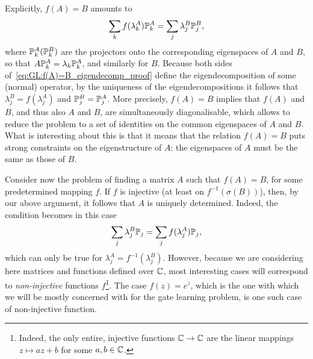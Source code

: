 Explicitly, $f(A)=B$ amounts to
\begin{equation}
    \sum_k f(\lambda_k^A) {\mathbb{P}}_k^A = \sum_j \lambda_j^B {\mathbb{P}}_j^B,
    \label{eq:GL:f(A)=B_eigendecomp_proof}
\end{equation}
where ${\mathbb{P}}_k^{A} ({\mathbb{P}}_k^{B})$ are the projectors onto the corresponding eigenspaces of $A$ and $B$, so that
$A{\mathbb{P}}_k^A=\lambda_k {\mathbb{P}}_k^A$, and similarly for $B$.
Because both sides of~\cref{eq:GL:f(A)=B_eigendecomp_proof} define the eigendecomposition of some (normal) operator, by the uniqueness of the eigendecompositions it follows that $\lambda_j^B=f(\lambda_j^A)$ and ${\mathbb{P}}_j^B={\mathbb{P}}_j^A$.
More precisely, $f(A)=B$ implies that $f(A)$ and $B$, and thus also $A$ and $B$, are simultaneously diagonalisable, which allows to reduce the problem to a set of identities on the common eigenspaces of $A$ and $B$.
What is interesting about this is that it means that the relation $f(A)=B$ puts strong constraints on the eigenstructure of $A$: the eigenspaces of $A$ must be the same as those of $B$.

Consider now the problem of finding a matrix $A$ such that $f(A)=B$, for some predetermined mapping $f$.
If $f$ is injective (at least on $f^{-1}(\sigma(B))$), then, by our above argument, it follows that $A$ is uniquely determined. Indeed, the condition becomes in this case
\begin{equation}
    \sum_j \lambda_j^B {\mathbb{P}}_j = \sum_j f(\lambda_j^A) {\mathbb{P}}_j,
\end{equation}
which can only be true for $\lambda_j^A = f^{-1}(\lambda_j^B)$.
However, because we are considering here matrices and functions defined over ${\mathbb{C}}$, most interesting cases will correspond to \textit{non-injective} functions $f$\footnote{Indeed, the only entire, injective functions ${\mathbb{C}}\to{\mathbb{C}}$ are the linear mappings $z\mapsto az+b$ for some $a,b\in{\mathbb{C}}$.}. The case $f(z)=e^z$, which is the one with which we will be mostly concerned with for the gate learning problem, is one such case of non-injective function.

